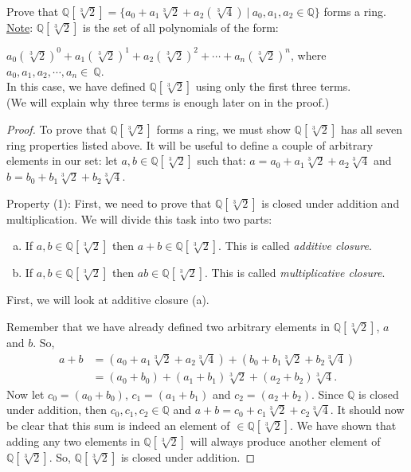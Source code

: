 \begin{example}\label{example:rings:extension_ring}
Prove that ${\mathbb Q}[\sqrt[3]{2}]=\{a_0+a_1\sqrt[3]{2}+a_2(\sqrt[3]{4})~|~a_0,a_1,a_2\in {\mathbb Q}\}$ forms a ring.\\

\underline{Note}: ${\mathbb Q}[\sqrt[3]{2}]$ is the set of all polynomials of the form:

$a_0(\sqrt[3]{2})^0+a_1(\sqrt[3]{2})^1+a_2(\sqrt[3]{2})^2+\cdots+a_n(\sqrt[3]{2})^n$, where $a_0,a_1,a_2,\cdots,a_n\in~{\mathbb Q}$.\\

In this case, we have defined ${\mathbb Q}[\sqrt[3]{2}]$ using only the first three terms.\\ 
(We will explain why three terms is enough later on in the proof.) \\

\begin{proof}
To prove that ${\mathbb Q}[\sqrt[3]{2}]$ forms a ring, we must show ${\mathbb Q}[\sqrt[3]{2}]$ has all seven ring properties listed above. It will be useful to define a couple of arbitrary elements in our set:
let $a,b\in{\mathbb Q}[\sqrt[3]{2}]$ such that:
$a=a_0+a_1\sqrt[3]{2}+a_2\sqrt[3]{4}$ and $b=b_0+b_1\sqrt[3]{2}+b_2\sqrt[3]{4}$.
\medskip

Property (1):  First, we need to prove that ${\mathbb Q}[\sqrt[3]{2}]$ is closed under addition and multiplication. We will divide this task into two parts:
\begin{enumerate}[(a)]

\item If $a,b\in{\mathbb Q}[\sqrt[3]{2}]$ then $a+b\in {\mathbb Q}[\sqrt[3]{2}]$. This is called \emph{additive closure}.
\item If $a,b\in{\mathbb Q}[\sqrt[3]{2}]$ then $ab\in {\mathbb Q}[\sqrt[3]{2}]$. This is called \emph{multiplicative closure}.
\end{enumerate}
First, we will look at additive closure (a).

Remember that we have already defined two arbitrary elements in ${\mathbb Q}[\sqrt[3]{2}]$, $a$ and $b$. So,
\begin{align*}
a+b&=(a_0+a_1\sqrt[3]{2}+a_2\sqrt[3]{4})+(b_0+b_1\sqrt[3]{2}+b_2\sqrt[3]{4})\\
&=(a_0+b_0)+(a_1+b_1)\sqrt[3]{2}+(a_2+b_2)\sqrt[3]{4}.
\end{align*}
Now let $c_0=(a_0+b_0)$, $c_1=(a_1+b_1)$ and $c_2=(a_2+b_2)$. Since ${\mathbb Q}$ is closed under addition, then $c_0,c_1,c_2\in{\mathbb Q}$ and $a+b=c_0+c_1\sqrt[3]{2}+c_2\sqrt[3]{4}.$ It should now be clear that this sum is indeed an element of $\in{\mathbb Q}[\sqrt[3]{2}]$. We have shown that adding any two elements in ${\mathbb Q}[\sqrt[3]{2}]$ will always produce another element of ${\mathbb Q}[\sqrt[3]{2}]$. So, ${\mathbb Q}[\sqrt[3]{2}]$ is closed under addition.


\end{proof}
\end{example}
